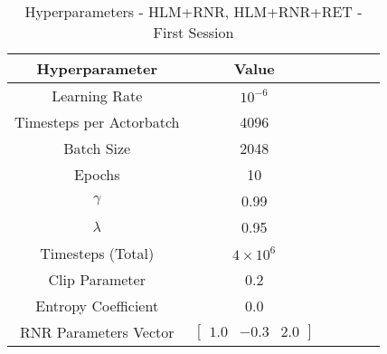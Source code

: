 \begin{table}[!htbp]
	\caption{Hyperparameters - HLM+RNR, HLM+RNR+RET - First Session}
	\begin{center} 
		\begin{tabular}{|c|c|c|c|c|c|}
			\hline
			Hyperparameter & Value   \\
			\hline
			Learning Rate &    $10^{-6}$    \\
			Timesteps per Actorbatch & 4096    \\
			Batch Size &   2048     \\
			Epochs &  10\\
			$\gamma$ & 0.99 \\
			$\lambda$ & 0.95 \\
			Timesteps (Total) & $4 \times 10^{6}$ \\
			Clip Parameter & 0.2\\
			Entropy Coefficient & 0.0 \\
			RNR Parameters Vector  & $\begin{bmatrix}
			1.0 & -0.3 & 2.0
			\end{bmatrix}$\\
			\hline
		\end{tabular}
		
		\label{tab:finaltest}
	\end{center}
\end{table}
